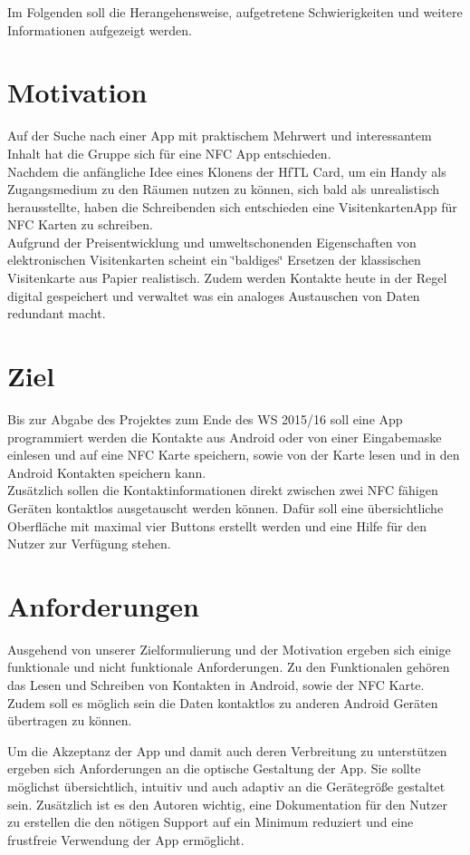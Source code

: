 \documentclass[a4paper,ngerman,12pt]{report}
\begin{document}
Im Folgenden soll die Herangehensweise, aufgetretene Schwierigkeiten und weitere Informationen aufgezeigt werden.

\section{Motivation}

Auf der Suche nach einer App mit praktischem Mehrwert und interessantem Inhalt hat die Gruppe sich für eine NFC App entschieden. \\
Nachdem die anfängliche Idee eines Klonens der HfTL Card, um ein Handy als Zugangsmedium zu den Räumen nutzen zu können, sich bald als unrealistisch herausstellte, haben die Schreibenden sich entschieden eine VisitenkartenApp für NFC Karten zu schreiben. \\
Aufgrund der Preisentwicklung und umweltschonenden Eigenschaften von elektronischen Visitenkarten scheint ein \char`\"{}baldiges\char`\"{} Ersetzen der klassischen Visitenkarte aus Papier realistisch. Zudem werden Kontakte heute in der Regel digital gespeichert und verwaltet was ein analoges Austauschen von Daten redundant macht.

\section{Ziel}
Bis zur Abgabe des Projektes zum Ende des WS 2015/16 soll eine App programmiert werden die Kontakte aus Android oder von einer Eingabemaske einlesen und auf eine NFC Karte speichern, sowie von der Karte lesen und in den Android Kontakten speichern kann. \\
Zusätzlich sollen die Kontaktinformationen direkt zwischen zwei NFC fähigen Geräten kontaktlos ausgetauscht werden können. Dafür soll eine übersichtliche Oberfläche mit maximal vier Buttons erstellt werden und eine Hilfe für den Nutzer zur Verfügung stehen.

\section{Anforderungen}
Ausgehend von unserer Zielformulierung und der Motivation ergeben sich einige funktionale und nicht funktionale Anforderungen.
Zu den Funktionalen gehören das Lesen und Schreiben von Kontakten in Android, sowie der NFC Karte.
Zudem soll es möglich sein die Daten kontaktlos zu anderen Android Geräten übertragen zu können.\newline

Um die Akzeptanz der App und damit auch deren Verbreitung zu unterstützen ergeben sich Anforderungen an die optische Gestaltung der App. Sie sollte möglichst übersichtlich, intuitiv und auch adaptiv an die Gerätegröße gestaltet sein. Zusätzlich ist es den Autoren wichtig, eine Dokumentation für den Nutzer zu erstellen die den nötigen Support auf ein Minimum reduziert und eine frustfreie Verwendung der App ermöglicht.
\end{document}
